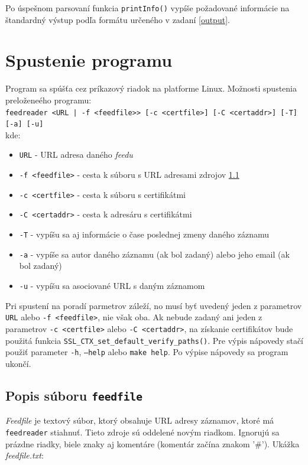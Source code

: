 \documentclass[a4paper, 11pt]{article}
\begin{document}
    Po úspešnom parsovaní funkcia \texttt{printInfo()} vypíše požadované informácie na štandardný výstup podľa formátu určeného v zadaní \ref{output}. 

    \section{Spustenie programu}
    \label{start}
    Program sa spúšťa cez príkazový riadok na platforme Linux. Možnosti spustenia preloženeého programu: \\
    \texttt{feedreader <URL | -f <feedfile>> [-c <certfile>] [-C <certaddr>] [-T] [-a] [-u]} \\
    kde: \\
    \begin{itemize}
        \item \texttt{URL} - URL adresa daného \textit{feedu}
        \item \texttt{-f <feedfile>} - cesta k súboru s URL adresami zdrojov \ref{feedfile}
        \item \texttt{-c <certfile>} - cesta k súboru s certifikátmi
        \item \texttt{-C <certaddr>} - cesta k adresáru s certifikátmi
        \item \texttt{-T} - vypíšu sa aj informácie o čase poslednej zmeny daného záznamu
        \item \texttt{-a} - vypíše sa autor daného záznamu (ak bol zadaný) alebo jeho email (ak bol zadaný)
        \item \texttt{-u} - vypíšu sa asociované URL s daným záznamom
    \end{itemize}
    Pri spustení na poradí parmetrov záleží, no musí byť uvedený jeden z parametrov \texttt{URL} alebo \texttt{-f <feedfile>}, nie však oba. Ak nebude zadaný ani jeden z parametrov \texttt{-c <certfile>} alebo \texttt{-C <certaddr>}, na získanie certifikátov bude použitá funkcia \texttt{SSL\_CTX\_set\_default\_verify\_paths()}. Pre výpis nápovedy stačí použiť parameter \texttt{-h}, \texttt{--help} alebo \texttt{make help}. Po výpise nápovedy sa program ukončí.
    
    \subsection{Popis súboru \texttt{feedfile}}
    \label{feedfile}
    \textit{Feedfile} je textový súbor, ktorý obsahuje URL adresy záznamov, ktoré má \texttt{feedreader} stiahnuť. Tieto zdroje sú oddelené novým riadkom. Ignorujú sa prázdne riadky, biele znaky aj komentáre (komentár začína znakom '\#'). Ukážka \textit{feedfile.txt}: \\
    
\end{document}
